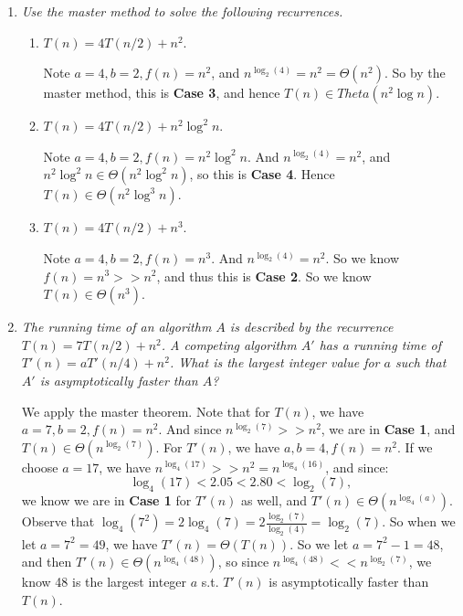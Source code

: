 \documentclass[10pt,oneside,reqno]{amsart}
\theoremstyle{plain}
\theoremstyle{definition}
\newcommand{\bee}{\begin{equation}\begin{aligned}}
\newcommand{\eee}{\end{aligned}\end{equation}}
\newcommand{\fracc}{\frac}
\begin{document}
\begin{enumerate}[label=\arabic*.]
\begin{proof}
So we have that the time to divide and combine on each level of the tree adds to $cn$. And the height of the tree is $\log_2n$ since the longest path to a tree node is along the left hand side, where all the recursive calls are $T(n/2)$. So we have: 
\bee
T(n) &= cn + cn + \cdots + b\\
&= \log_2n(cn) \in \Theta(n\log n). 
\eee
\end{proof}

\item \textit{Use the master method to solve the following recurrences. }

\begin{enumerate}
\item $T(n) = 4T(n/2) + n^2$. 

Note $a = 4,b = 2,f(n) = n^2$, and $n^{\log_2(4)} =n^2 = \Theta(n^2)$. So by the master method, this is \textbf{Case 3}, and hence $T(n) \in Theta(n^2\log n)$. 
\item $T(n) = 4T(n/2) + n^2\log^2n$. 

Note $a = 4,b = 2,f(n) = n^2\log^2n$. And $n^{\log_2(4)} = n^2$, and $n^2\log^2n \in \Theta(n^2\log^2n)$, so this is \textbf{Case 4}. Hence $T(n) \in \Theta(n^2\log^3n)$. 
\item $T(n) = 4T(n/2) + n^3$. 

Note $a = 4,b = 2,f(n) = n^3$. And $n^{\log_2(4)} = n^2$. So we know $f(n) = n^3 >> n^2$, and thus this is \textbf{Case 2}. So we know $T(n) \in \Theta(n^3)$. 
\end{enumerate}
\item \textit{The running time of an algorithm $A$ is described by the recurrence $T(n) = 7T(n/2) + n^2$. A competing algorithm $A'$ has a running time of $T'(n) = aT'(n/4) + n^2$. What is the largest integer value for $a$ such that $A'$ is asymptotically faster than $A$?}

We apply the master theorem. Note that for $T(n)$, we have $a = 7,b = 2,f(n) = n^2$. And since $n^{\log_2(7)} >> n^2$, we are in \textbf{Case 1}, and $T(n) \in \Theta(n^{\log_2(7)})$. For $T'(n)$, we have $a,b = 4,f(n) = n^2$. If we choose $a = 17$, we have $n^{\log_4(17)} >> n^2 = n^{\log_4(16)}$, and since:
$$
 \log_4(17) < 2.05 < 2.80 < \log_2(7),
 $$
 we know we are in \textbf{Case 1} for $T'(n)$ as well, and $T'(n) \in \Theta(n^{\log_4(a)})$. Observe that $\log_4(7^2) = 2\log_4(7) = 2\fracc{\log_2(7)}{\log_2(4)} = \log_2(7)$. So when we let $a = 7^2 = 49$, we have $T'(n) = \Theta(T(n))$. So we let $a = 7^2 - 1 = 48$, and then $T'(n) \in \Theta(n^{\log_4(48)})$, so since $n^{\log_4(48)} << n^{\log_2(7)}$, we know 48 is the largest integer $a$ s.t. $T'(n)$ is asymptotically faster than $T(n)$. 
\end{enumerate}
\end{document}
